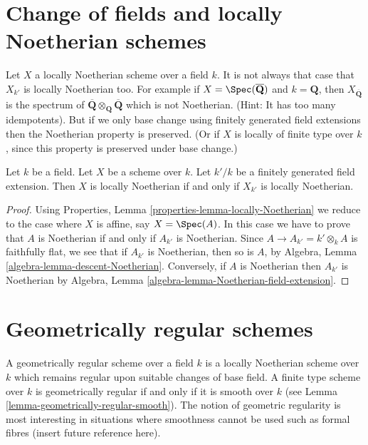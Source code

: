 \section{Change of fields and locally Noetherian schemes}
\label{section-locally-Noetherian}

\noindent
Let $X$ a locally Noetherian scheme over a field $k$.
It is not always that case that $X_{k'}$ is locally Noetherian too.
For example if $X = \Spec(\overline{\mathbf{Q}})$ and
$k = \mathbf{Q}$, then $X_{\overline{\mathbf{Q}}}$ is the spectrum
of $\overline{\mathbf{Q}} \otimes_{\mathbf{Q}} \overline{\mathbf{Q}}$
which is not Noetherian. (Hint: It has too many idempotents).
But if we only base change using finitely generated field extensions
then the Noetherian property is preserved. (Or if $X$ is locally of finite
type over $k$, since this property is preserved under base change.)

\begin{lemma}
\label{lemma-locally-Noetherian-base-change}
Let $k$ be a field.
Let $X$ be a scheme over $k$.
Let $k'/k$ be a finitely generated field extension.
Then $X$ is locally Noetherian if and only if $X_{k'}$ is locally
Noetherian.
\end{lemma}

\begin{proof}
Using Properties, Lemma \ref{properties-lemma-locally-Noetherian}
we reduce to the case where $X$ is
affine, say $X = \Spec(A)$. In this case we have to prove that
$A$ is Noetherian if and only if $A_{k'}$ is Noetherian.
Since $A \to A_{k'} = k' \otimes_k A$ is faithfully flat, we see
that if $A_{k'}$ is Noetherian, then so is $A$, by
Algebra, Lemma \ref{algebra-lemma-descent-Noetherian}.
Conversely, if $A$ is Noetherian then $A_{k'}$ is Noetherian by
Algebra, Lemma \ref{algebra-lemma-Noetherian-field-extension}.
\end{proof}







\section{Geometrically regular schemes}
\label{section-geometrically-regular}

\noindent
A geometrically regular scheme over a field $k$ is a locally Noetherian
scheme over $k$ which remains regular upon suitable changes of base field.
A finite type scheme over $k$ is geometrically regular if and only
if it is smooth over $k$ (see Lemma \ref{lemma-geometrically-regular-smooth}).
The notion of geometric regularity is most interesting in situations
where smoothness cannot be used such as formal fibres (insert future
reference here).

